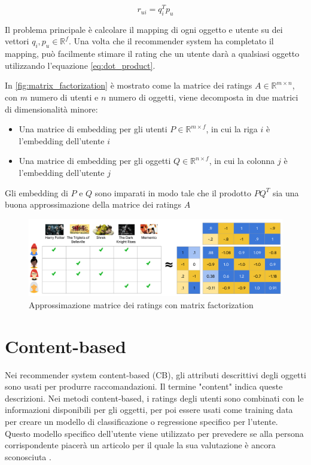 \documentclass[12pt,italian]{report}
\begin{document}
\begin{equation} \label{eq:dot_product}
r_{ui} = q_i^Tp_u
\end{equation}

Il problema principale è calcolare il mapping di ogni oggetto e utente su dei vettori $q_i, p_u \in \mathbb{R}^f$. Una volta che il recommender system ha completato il mapping, può facilmente stimare il rating che un utente darà a qualsiasi oggetto utilizzando l'equazione \ref{eq:dot_product}. 

In \autoref{fig:matrix_factorization} è mostrato come la matrice dei ratings $A \in \mathbb{R}^{m \times n}$, con $m$ numero di utenti e $n$ numero di oggetti, viene decomposta in due matrici di dimensionalità minore:

\begin{itemize}
	\item Una matrice di embedding per gli utenti $P \in \mathbb{R}^{m \times f}$, in cui la riga $i$ è l'embedding dell'utente $i$
	\item Una matrice di embedding per gli oggetti $Q \in \mathbb{R}^{n \times f}$, in cui la colonna $j$ è l'embedding dell'utente $j$
\end{itemize}

Gli embedding di $P$ e $Q$ sono imparati in modo tale che il prodotto $PQ^T$ sia una buona approssimazione della matrice dei ratings $A$

\begin{figure}
  \includegraphics[width=\linewidth]{immagini/matrix_factorization.pdf}
  \caption{Approssimazione matrice dei ratings con matrix factorization}
  \label{fig:matrix_factorization}
\end{figure}

\section{Content-based}
Nei recommender system content-based (CB), gli attributi descrittivi degli oggetti sono usati per produrre raccomandazioni. Il termine "content" indica queste descrizioni. Nei metodi content-based, i ratings degli utenti sono combinati con le informazioni disponibili per gli oggetti, per poi essere usati come training data per creare un modello di classificazione o regressione specifico per l'utente. Questo modello specifico dell'utente viene utilizzato per prevedere se alla persona corrispondente piacerà un articolo per il quale la sua valutazione è ancora sconosciuta \cite{recsys-book}.
\end{document}
